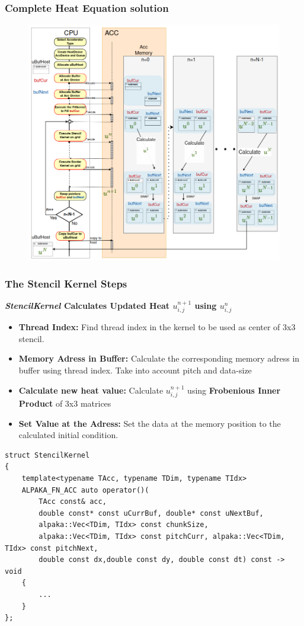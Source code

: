 \documentclass[9pt]{beamer}
\begin{document}
\begin{frame}
\frametitle{Complete Heat Equation solution}
\vspace{-0.73\baselineskip}
\begin{figure}
    \centering
    \includegraphics[width=0.92\linewidth,height=0.90\textheight]{Screenshot from 2024-09-26 15-13-53.png}
\end{figure}
\end{frame}


\begin{frame}[fragile]
\frametitle{The Stencil Kernel Steps}
\small
 \textbf{\textit{StencilKernel} Calculates Updated Heat  $u_{i,j}^{n+1}$ using $u_{i,j}^{n}$ }
    \lstset{basicstyle=\ttfamily\scriptsize}

    \begin{itemize}
    \item \textbf{Thread Index:} Find thread index in the kernel to be used as center of 3x3 stencil.
    \item \textbf{Memory Adress in Buffer:} Calculate the corresponding memory adress in buffer using thread index. Take into account pitch and data-size
    \item \textbf{Calculate new heat value:} Calculate $u_{i,j}^{n+1}$ using \textbf{Frobenious Inner Product} of 3x3 matrices
    \item \textbf{Set Value at the Adress:} Set the data at the memory position to the calculated initial condition.
    \end{itemize}
    \begin{lstlisting}
struct StencilKernel
{
    template<typename TAcc, typename TDim, typename TIdx>
    ALPAKA_FN_ACC auto operator()(
        TAcc const& acc,
        double const* const uCurrBuf, double* const uNextBuf,
        alpaka::Vec<TDim, TIdx> const chunkSize,
        alpaka::Vec<TDim, TIdx> const pitchCurr, alpaka::Vec<TDim, TIdx> const pitchNext,
        double const dx,double const dy, double const dt) const -> void
    {
        ...
    }
};
    \end{lstlisting}
\end{frame}
\end{document}
